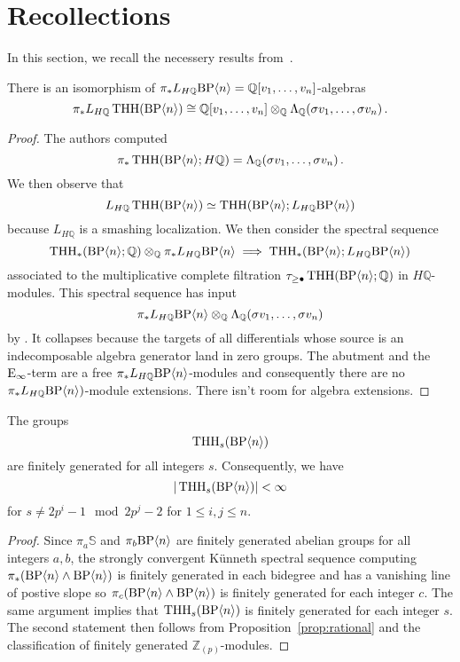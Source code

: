\section{Recollections}
In this section, we recall the necessery results from~\cite{AKCH24}. 

\begin{proposition}\label{prop:rational}
There is an isomorphism of $\pi_{*}L_{H\mathbb{Q}}\mathrm{BP}\langle n\rangle=\mathbb{Q}[v_{1},\dots ,v_{n}]$-algebras
\[ \pi_{*}L_{H\mathbb{Q}}\operatorname{THH}(\mathrm{BP}\langle n\rangle )\cong\mathbb{Q}[v_{1},\dots ,v_{n}]\otimes_{\mathbb{Q}} \Lambda_{\mathbb{Q}} (\sigma v_{1},\dots ,\sigma v_{n}) \,.\]
\end{proposition}
\begin{proof}
The authors computed 
\[ \pi_{*}\operatorname{THH}(\mathrm{BP}\langle n\rangle;H\mathbb{Q} )=\Lambda_{\mathbb{Q}} (\sigma v_{1},\dots ,\sigma v_{n})\,.\]
We then observe that 
\[L_{H\mathbb{Q}}\operatorname{THH}(\mathrm{BP}\langle n\rangle )\simeq \operatorname{THH}(\mathrm{BP}\langle n\rangle;L_{H\mathbb{Q}}\mathrm{BP}\langle n\rangle )\]
because $L_{H\mathbb{Q}}$ is a smashing localization. We then consider the spectral sequence 
\[
\operatorname{THH}_{*}(\mathrm{BP}\langle n\rangle;\mathbb{Q})\otimes_{\mathbb{Q}} \pi_{*}L_{H\mathbb{Q}}\mathrm{BP}\langle n\rangle\implies \operatorname{THH}_{*}(\mathrm{BP}\langle n\rangle;L_{H\mathbb{Q}}\mathrm{BP}\langle n\rangle)
\]
associated to the multiplicative complete filtration $\tau_{\ge \bullet}\operatorname{THH}(\mathrm{BP}\langle n\rangle;\mathbb{Q})$ in $H\mathbb{Q}$-modules. This spectral sequence has input 
\[ \pi_{*}L_{H\mathbb{Q}}\mathrm{BP}\langle n\rangle\otimes_{\mathbb{Q}} \Lambda_{\mathbb{Q}} (\sigma v_{1},\dots ,\sigma v_{n})\]
by \cite[Proposition~3.7]{AKCH24}. It collapses because the targets of all differentials whose source is an indecomposable algebra generator land in zero groups. The abutment and the $\mathrm{E}_{\infty}$-term are a free $\pi_{*}L_{H\mathbb{Q}}\mathrm{BP}\langle n\rangle$-modules and consequently there are no $\pi_{*}L_{H\mathbb{Q}}\mathrm{BP}\langle n\rangle)$-module extensions. There isn't room for algebra extensions. 
\end{proof}

\begin{proposition}
The groups 
\[ 
\operatorname{THH}_{s}(\mathrm{BP}\langle n\rangle )
\]
are finitely generated for all integers $s$. 
Consequently, we have 
\[
|\operatorname{THH}_{s}(\mathrm{BP}\langle n\rangle )|<\infty\]
for $s\ne 2p^{i}-1 \mod 2p^{j}-2$ for $1\le i,j\le n$. 
\end{proposition}
\begin{proof}
Since $\pi_{a}\mathbb{S}$ and $\pi_{b}\mathrm{BP}\langle n\rangle$ are finitely generated abelian groups for all integers $a,b$, the strongly convergent K\"unneth spectral sequence computing $\pi_{*}(\mathrm{BP}\langle n\rangle\wedge \mathrm{BP}\langle n\rangle)$ is finitely generated in each bidegree and has a vanishing line of postive slope so $\pi_{c}(\mathrm{BP}\langle n\rangle\wedge \mathrm{BP}\langle n\rangle)$ is finitely generated for each integer $c$. The same argument implies that $\operatorname{THH}_{s}(\mathrm{BP}\langle n\rangle)$ is finitely generated for each integer $s$. The second statement then follows from Proposition~\ref{prop:rational} and the classification of finitely generated $\mathbb{Z}_{(p)}$-modules. 
\end{proof}